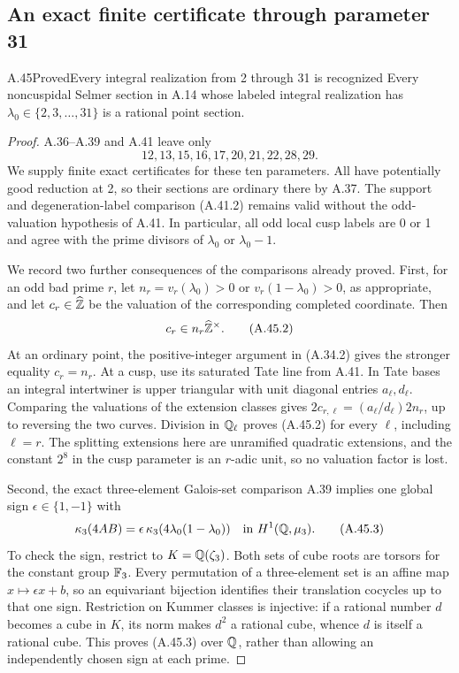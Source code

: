 \subsection{An exact finite certificate through parameter 31}

\begin{statement}{A.45}{Proved}{Every integral realization from 2 through 31 is recognized}
Every noncuspidal Selmer section in A.14 whose labeled integral
realization has $\lambda_0\in\{2,3,\ldots,31\}$ is a rational
point section.
\end{statement}
\begin{proof}
A.36--A.39 and A.41 leave only
\[
                  12,13,15,16,17,20,21,22,28,29.
\tag{A.45.1}
\]
We supply finite exact certificates for these ten parameters.  All
have potentially good reduction at 2, so their sections are ordinary
there by A.37.  The support and degeneration-label comparison
(A.41.2) remains valid without the odd-valuation hypothesis of
A.41.  In particular, all odd local cusp labels are 0 or 1 and
agree with the prime divisors of $\lambda_0$ or $\lambda_0-1$.

We record two further consequences of the comparisons already
proved.  First, for an odd bad prime $r$, let
$n_r=v_r(\lambda_0)>0$ or $v_r(1-\lambda_0)>0$, as appropriate,
and let $c_r\in\widehat{\mathbb Z}$ be the valuation of the corresponding
completed coordinate.  Then
\[
                     c_r\in n_r\widehat{\mathbb Z}^\times.
\tag{A.45.2}
\]
At an ordinary point, the positive-integer argument in (A.34.2)
gives the stronger equality $c_r=n_r$.  At a cusp, use its
saturated Tate line from A.41.  In Tate bases an integral
intertwiner is upper triangular with unit diagonal entries
$a_\ell,d_\ell$.  Comparing the valuations of the extension
classes gives $2c_{r,\ell}=(a_\ell/d_\ell)2n_r$, up to reversing
the two curves.  Division in $\mathbb Q_\ell$ proves (A.45.2) for every
$\ell$, including $\ell=r$.  The splitting extensions here are
unramified quadratic extensions, and the constant $2^8$ in the
cusp parameter is an $r$-adic unit, so no valuation factor is lost.

Second, the exact three-element Galois-set comparison A.39 implies
one global sign $\epsilon\in\{1,-1\}$ with
\[
       \kappa_3(4AB)=
       \epsilon\,\kappa_3(4\lambda_0(1-\lambda_0))
                 \quad\text{in }H^1(\mathbb Q,\mu_3).
\tag{A.45.3}
\]
To check the sign, restrict to $K=\mathbb Q(\zeta_3)$.  Both sets of
cube roots are torsors for the constant group $\mathbb F_3$.
Every permutation of a three-element set is an affine map
$x\mapsto\epsilon x+b$, so an equivariant bijection identifies
their translation cocycles up to that one sign.  Restriction on
Kummer classes is injective: if a rational number $d$ becomes a
cube in $K$, its norm makes $d^2$ a rational cube, whence $d$ is
itself a rational cube.  This proves (A.45.3) over $\mathbb Q$, rather
than allowing an independently chosen sign at each prime.


\end{proof}
